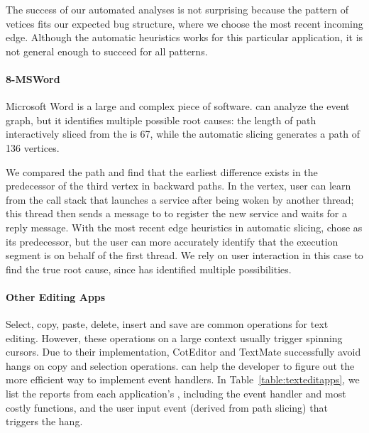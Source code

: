 The success of our automated analyses 
is not surprising because the pattern of vetices fits our expected bug structure,
where we choose the most recent incoming edge.
Although the automatic heuristics works for this particular application, it is
not general enough to succeed for all patterns.

\paragraph{8-MSWord}

Microsoft Word is a large and complex piece of software. \xxx can analyze the
event graph, but it identifies multiple possible root causes: the length of path
interactively sliced from the \spinningnode is 67, while the automatic slicing
generates a path of 136 vertices.


We compared the path and find that the earliest difference exists in the
predecessor of the third vertex in backward paths. In the vertex, user
can learn from the call stack that  launches a service
 after being woken by another
 thread; this thread then sends a message to 
to register the new service and waits for a reply message. With the most
recent edge heuristics in automatic slicing, \xxx chose  as its
predecessor, but the user can more accurately identify that the execution segment
is on behalf of the first thread. We rely on user interaction in this case
to find the true root cause, since \xxx has identified multiple
possibilities.

\paragraph{Other Editing Apps}

Select, copy, paste, delete, insert and save are common operations for text
editing. However, these operations on a large context usually trigger spinning
cursors. Due to their implementation, CotEditor and TextMate successfully
avoid hangs on copy and selection operations. \xxx can help the developer
to figure out the more efficient way to implement event handlers. In
Table~\ref{table:texteditapps}, we list the reports from each application's
\spinningnode, including the event handler and most costly functions, and the
user input event (derived from path slicing) that triggers the hang.

